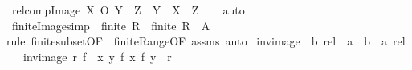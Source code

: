\begin{isabellebody}
%
\endisadelimproof
\isanewline
{}\isamarkupfalse%
\ relcomp{\isacharunderscore}{\kern0pt}Image{\isacharcolon}{\kern0pt}\ {\isachardoublequoteopen}{\isacharparenleft}{\kern0pt}X\ O\ Y{\isacharparenright}{\kern0pt}\ {\isacharbackquote}{\kern0pt}{\isacharbackquote}{\kern0pt}\ Z\ {\isacharequal}{\kern0pt}\ Y\ {\isacharbackquote}{\kern0pt}{\isacharbackquote}{\kern0pt}\ {\isacharparenleft}{\kern0pt}X\ {\isacharbackquote}{\kern0pt}{\isacharbackquote}{\kern0pt}\ Z{\isacharparenright}{\kern0pt}{\isachardoublequoteclose}\isanewline
%
\isadelimproof
\ \ %
\endisadelimproof
%
\isatagproof
{}\isamarkupfalse%
\ auto%
\endisatagproof
{\isafoldproof}%
%
\isadelimproof
\isanewline
%
\endisadelimproof
\isanewline
{}\isamarkupfalse%
\ finite{\isacharunderscore}{\kern0pt}Image{\isacharbrackleft}{\kern0pt}simp{\isacharbrackright}{\kern0pt}{\isacharcolon}{\kern0pt}\ \ {\isachardoublequoteopen}finite\ R{\isachardoublequoteclose}\ \ {\isachardoublequoteopen}finite\ {\isacharparenleft}{\kern0pt}R\ {\isacharbackquote}{\kern0pt}{\isacharbackquote}{\kern0pt}\ A{\isacharparenright}{\kern0pt}{\isachardoublequoteclose}\isanewline
%
\isadelimproof
%
\endisadelimproof
%
\isatagproof
{}\isamarkupfalse%
{\isacharparenleft}{\kern0pt}rule\ finite{\isacharunderscore}{\kern0pt}subset{\isacharbrackleft}{\kern0pt}OF\ {\isacharunderscore}{\kern0pt}\ finite{\isacharunderscore}{\kern0pt}Range{\isacharbrackleft}{\kern0pt}OF\ assms{\isacharbrackright}{\kern0pt}{\isacharbrackright}{\kern0pt}{\isacharparenright}{\kern0pt}\ auto%
\endisatagproof
{\isafoldproof}%
%
\isadelimproof
%
\endisadelimproof
%
\isadelimdocument
%
\endisadelimdocument
%
\isatagdocument
%
\isamarkuptrue%
%
\endisatagdocument
{\isafolddocument}%
%
\isadelimdocument
%
\endisadelimdocument
{}\isamarkupfalse%
\ inv{\isacharunderscore}{\kern0pt}image\ {\isacharcolon}{\kern0pt}{\isacharcolon}{\kern0pt}\ {\isachardoublequoteopen}{\isacharprime}{\kern0pt}b\ rel\ {\isasymRightarrow}\ {\isacharparenleft}{\kern0pt}{\isacharprime}{\kern0pt}a\ {\isasymRightarrow}\ {\isacharprime}{\kern0pt}b{\isacharparenright}{\kern0pt}\ {\isasymRightarrow}\ {\isacharprime}{\kern0pt}a\ rel{\isachardoublequoteclose}\isanewline
\ \ \ {\isachardoublequoteopen}inv{\isacharunderscore}{\kern0pt}image\ r\ f\ {\isacharequal}{\kern0pt}\ {\isacharbraceleft}{\kern0pt}{\isacharparenleft}{\kern0pt}x{\isacharcomma}{\kern0pt}\ y{\isacharparenright}{\kern0pt}{\isachardot}{\kern0pt}\ {\isacharparenleft}{\kern0pt}f\ x{\isacharcomma}{\kern0pt}\ f\ y{\isacharparenright}{\kern0pt}\ {\isasymin}\ r{\isacharbraceright}{\kern0pt}{\isachardoublequoteclose}\isanewline

\end{isabellebody}
